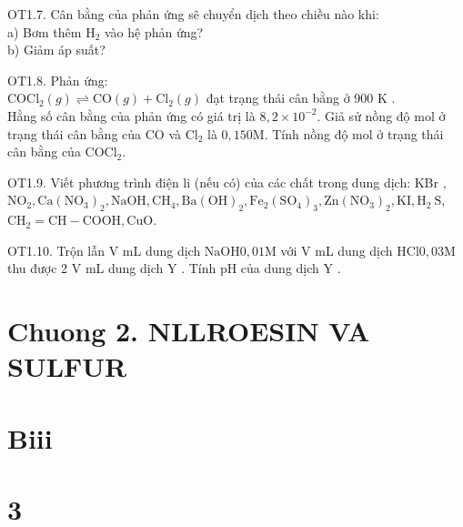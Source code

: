 \documentclass[10pt]{article}
\begin{document}
OT1.7. Cân bằng của phản ứng sẽ chuyển dịch theo chiều nào khi:\\
a) Bơm thêm $\mathrm{H}_{2}$ vào hệ phản ứng?\\
b) Giảm áp suất?

OT1.8. Phản ứng:\\
$\mathrm{COCl}_{2}(g) \rightleftharpoons \mathrm{CO}(g)+\mathrm{Cl}_{2}(g)$ đạt trạng thái cân bằng ở 900 K .\\
Hằng số cân bằng của phản ứng có giá trị là $8,2 \times 10^{-2}$. Giả sử nồng độ mol ở trạng thái cân bằng của CO và $\mathrm{Cl}_{2}$ là $0,150 \mathrm{M}$. Tính nồng độ mol ở trạng thái cân bằng của $\mathrm{COCl}_{2}$.

OT1.9. Viết phương trình điện li (nếu có) của các chất trong dung dịch: KBr , $\mathrm{NO}_{2}, \mathrm{Ca}\left(\mathrm{NO}_{3}\right)_{2}, \mathrm{NaOH}, \mathrm{CH}_{4}, \mathrm{Ba}(\mathrm{OH})_{2}, \mathrm{Fe}_{2}\left(\mathrm{SO}_{4}\right)_{3}, \mathrm{Zn}\left(\mathrm{NO}_{3}\right)_{2}, \mathrm{KI}, \mathrm{H}_{2} \mathrm{~S}$, $\mathrm{CH}_{2}=\mathrm{CH}-\mathrm{COOH}, \mathrm{CuO}$.

OT1.10. Trộn lẫn V mL dung dịch $\mathrm{NaOH} 0,01 \mathrm{M}$ với V mL dung dịch $\mathrm{HCl} 0,03 \mathrm{M}$ thu được 2 V mL dung dịch Y . Tính pH của dung dịch Y .

\section*{Chuong 2. NLLROESIN VA SULFUR}
\section*{Biii}
\section*{3}
\end{document}
